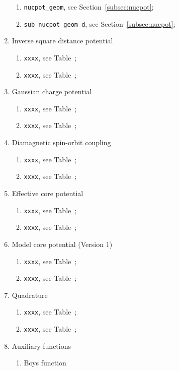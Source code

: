 \documentclass[a4paper,11pt,twoside,openright]{book}
\begin{document}
\begin{enumerate}
  \begin{enumerate}
    \item \verb|nucpot_geom|, see Section~\ref{subsec:nucpot};
    \item \verb|sub_nucpot_geom_d|, see Section~\ref{subsec:nucpot};
  \end{enumerate}
%
  \item Inverse square distance potential
  \begin{enumerate}
    \item \verb|xxxx|, see Table~;
    \item \verb|xxxx|, see Table~;
  \end{enumerate}
%
  \item Gaussian charge potential
  \begin{enumerate}
    \item \verb|xxxx|, see Table~;
    \item \verb|xxxx|, see Table~;
  \end{enumerate}
%
  \item Diamagnetic spin-orbit coupling
  \begin{enumerate}
    \item \verb|xxxx|, see Table~;
    \item \verb|xxxx|, see Table~;
  \end{enumerate}
%
  \item Effective core potential
  \begin{enumerate}
    \item \verb|xxxx|, see Table~;
    \item \verb|xxxx|, see Table~;
  \end{enumerate}
%
  \item Model core potential (Version 1)
  \begin{enumerate}
    \item \verb|xxxx|, see Table~;
    \item \verb|xxxx|, see Table~;
  \end{enumerate}
%
  \item Quadrature
  \begin{enumerate}
    \item \verb|xxxx|, see Table~;
    \item \verb|xxxx|, see Table~;
  \end{enumerate}
%
  \item Auxiliary functions
  \begin{enumerate}
    \item Boys function
    \begin{enumerate}

\end{enumerate}
\end{enumerate}
\end{enumerate}
\end{document}
